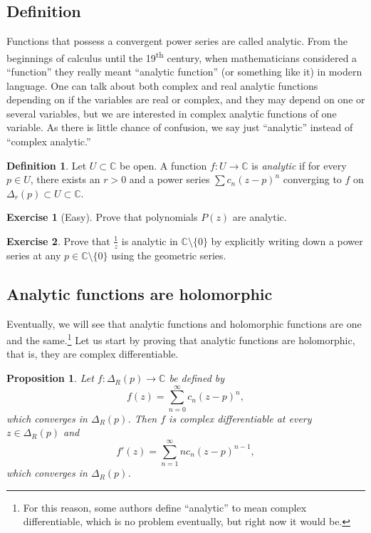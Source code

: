 \documentclass[12pt,openany]{book}
\newcommand{\C}{{\mathbb{C}}}
\newcommand{\myindex}[1]{#1\index{#1}}
\theoremstyle{plain}
\newtheorem{prop}[thm]{Proposition}
\theoremstyle{remark}
\theoremstyle{definition}
\newtheorem{defn}[thm]{Definition}
\newenvironment{exbox}{%
    \def\FrameCommand{\vrule width 1pt \relax\hspace{10pt}}%
    \MakeFramed{\advance\hsize-\width\FrameRestore}%
}{%
    \endMakeFramed
}
\theoremstyle{exercise}
\newtheorem{exercise}{Exercise}[section]
\theoremstyle{example}
\begin{document}
\subsection{Definition}

Functions that possess a convergent power series are called analytic.
From the beginnings of calculus until the 19\textsuperscript{th} century, 
when mathematicians considered a ``function'' they really meant
``analytic function'' (or something like it) in modern language.
One can talk about
both complex and real analytic functions depending on if the
variables are real or complex, and they may depend on one or several variables,
but we are interested in complex analytic functions of one variable. 
As there is little chance of confusion, we say just ``analytic'' instead of
``complex analytic.''

\begin{defn}
Let $U \subset \C$ be open.  A function $f \colon U \to \C$
is \emph{\myindex{analytic}}
if for every $p \in U$, there exists 
an $r > 0$ and a
power series $\sum c_n {(z-p)}^n$ converging to $f$ on $\Delta_r(p) \subset
U \subset \C$.
\end{defn}

\begin{exbox}
\begin{exercise}[Easy]
Prove that polynomials $P(z)$ are analytic.
\end{exercise}

\begin{exercise}
Prove that $\frac{1}{z}$ is analytic in $\C \setminus \{ 0 \}$
by explicitly writing down 
a power series at any $p \in \C \setminus \{ 0 \}$
using the geometric series.
\end{exercise}
\end{exbox}

\subsection{Analytic functions are holomorphic}

Eventually, we will see that analytic functions and holomorphic functions are
one and the same.\footnote{%
For this reason, some authors define ``analytic'' to mean complex differentiable,
which is no problem eventually, but right now it would be.}
Let us start by proving that
analytic functions are holomorphic, that is, they are complex
differentiable.

\begin{prop}
Let $f \colon \Delta_R(p) \to \C$ be defined by
\begin{equation*}
f(z) = \sum_{n=0}^\infty c_n {(z-p)}^n ,
\end{equation*}
which converges in $\Delta_R(p)$.
Then $f$ is complex differentiable at every $z \in \Delta_R(p)$ and
\begin{equation*}
f'(z) = \sum_{n=1}^\infty n c_n {(z-p)}^{n-1} ,
\end{equation*}
which converges in $\Delta_R(p)$.
\end{prop}
\end{document}
